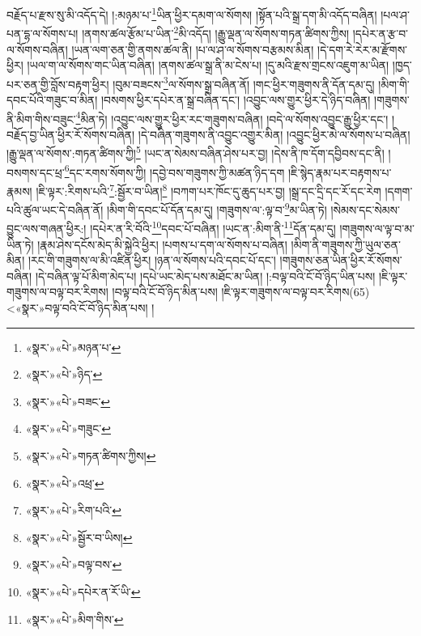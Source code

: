 བརྗོད་པ་རྫས་སུ་མི་འདོད་དེ། །:མཉམ་པ་\footnote{«སྣར་»«པེ་»མཉན་པ་}ཡིན་ཕྱིར་དམག་ལ་སོགས། །སྟོན་པའི་སྒྲ་དག་མི་འདོད་བཞིན། །པལ་ཤ་པན་དྷ་ལ་སོགས་པ། །ནགས་ཚལ་རྩོམ་པ་ཡིན་\footnote{«སྣར་»«པེ་»ཉིད་}མི་འདོད། །རྒྱུ་ལྡན་ལ་སོགས་གཏན་ཚིགས་ཀྱིས། །དཔེར་ན་རྩ་བ་ལ་སོགས་བཞིན། །ཡན་ལག་ཅན་གྱི་ནགས་ཚལ་ནི། །པ་ལ་ཤ་ལ་སོགས་བརྩམས་མིན། །དེ་དག་རེ་རེར་མ་རྫོགས་ཕྱིར། །ཡལ་ག་ལ་སོགས་གང་ཡིན་བཞིན། །ནགས་ཚལ་སྒྲ་ནི་མ་ངེས་པ། །དུ་མའི་རྫས་གྲངས་འཇུག་མ་ཡིན། །ཁྱད་པར་ཅན་གྱི་བློས་བརྟག་ཕྱིར། །བུམ་བཟངས་\footnote{«སྣར་»«པེ་»བཟང་}ལ་སོགས་སྒྲ་བཞིན་ནོ། །གང་ཕྱིར་གཟུགས་ནི་དོན་དམ་དུ། །མིག་གི་དབང་པོའི་གཟུང་བ་མིན། །བསགས་ཕྱིར་དཔེར་ན་སྒྲ་བཞིན་དང་། །འབྱུང་ལས་གྱུར་ཕྱིར་དེ་ཉིད་བཞིན། །གཟུགས་ནི་མིག་གིས་བཟུང་\footnote{«སྣར་»«པེ་»གཟུང་}མིན་ཏེ། །འབྱུང་ལས་གྱུར་ཕྱིར་རང་གཟུགས་བཞིན། །བདེ་ལ་སོགས་འབྱུང་རྒྱུ་ཕྱིར་དང་། །བརྗོད་བྱ་ཡིན་ཕྱིར་རོ་སོགས་བཞིན། །དེ་བཞིན་གཟུགས་ནི་འབྱུང་འགྱུར་མིན། །འབྱུང་ཕྱིར་མེ་ལ་སོགས་པ་བཞིན། །རྒྱུ་ལྡན་ལ་སོགས་:གཏན་ཚིགས་ཀྱི།\footnote{«སྣར་»«པེ་»གཏན་ཚིགས་ཀྱིས།} །ཡང་ན་སེམས་བཞིན་ཤེས་པར་བྱ། །དེས་ནི་ཁ་དོག་དབྱིབས་དང་ནི། །བསགས་དང་ཕྲ་\footnote{«སྣར་»«པེ་»འཕྲ་}དང་རགས་སོགས་ཀྱི། །དབྱེ་བས་གཟུགས་ཀྱི་མཚན་ཉིད་དག །ཇི་སྙེད་རྣམ་པར་བརྟགས་པ་རྣམས། །ཇི་ལྟར་:རིགས་པའི་\footnote{«སྣར་»«པེ་»རིག་པའི་}:སྦྱོར་བ་ཡིན།\footnote{«སྣར་»«པེ་»སྦྱོར་བ་ཡིས།} །བཀག་པར་ཁོང་དུ་ཆུད་པར་བྱ། །སྒྲ་དང་དྲི་དང་རོ་དང་རེག །དགག་པའི་ཚུལ་ཡང་དེ་བཞིན་ནོ། །མིག་གི་དབང་པོ་དོན་དམ་དུ། །གཟུགས་ལ་:ལྟ་བ་\footnote{«སྣར་»«པེ་»བལྟ་བས་}མ་ཡིན་ཏེ། །སེམས་དང་སེམས་བྱུང་ལས་གཞན་ཕྱིར:། །དཔེར་ན་རི་བོའི་\footnote{«སྣར་»«པེ་»དཔེར་ན་རོ་ཡི་}དབང་པོ་བཞིན། །ཡང་ན་:མིག་ནི་\footnote{«སྣར་»«པེ་»མིག་གིས་}དོན་དམ་དུ། །གཟུགས་ལ་ལྟ་བ་མ་ཡིན་ཏེ། །རྣམ་ཤེས་དངོས་མེད་མི་སྐྱེའི་ཕྱིར། །པགས་པ་དག་ལ་སོགས་པ་བཞིན། །མིག་ནི་གཟུགས་ཀྱི་ཡུལ་ཅན་མིན། །རང་གི་གཟུགས་ལ་མི་འཛིན་ཕྱིར། །ཉན་ལ་སོགས་པའི་དབང་པོ་དང་། །གཟུགས་ཅན་ཡིན་ཕྱིར་རོ་སོགས་བཞིན། །དེ་བཞིན་ལྟ་པོ་མིག་མེད་པ། །དཔེ་ཡང་མེད་པས་མཐོང་མ་ཡིན། །:བལྟ་བའི་ངོ་བོ་ཉིད་ཡིན་པས། །ཇི་ལྟར་གཟུགས་ལ་བལྟ་བར་རིགས། །བལྟ་བའི་ངོ་བོ་ཉིད་མིན་པས། །ཇི་ལྟར་གཟུགས་ལ་བལྟ་བར་རིགས(65) <«སྣར་»བལྟ་བའི་ངོ་བོ་ཉིད་མིན་པས། །
